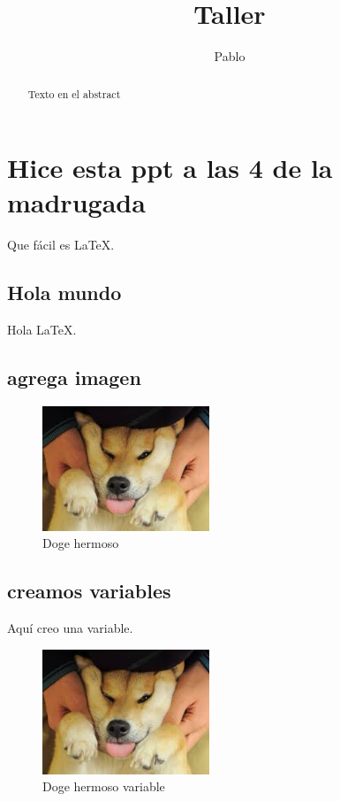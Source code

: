 \documentclass[]{article}
\title{Taller}
\author{Pablo}
\begin{document}
\maketitle

\begin{abstract}
	
	Texto en el abstract

\end{abstract}

\section{Hice esta ppt a las 4 de la madrugada}

Que fácil es \LaTeX.

\subsection{Hola mundo}

Hola \LaTeX.

\subsection{agrega imagen}

\begin{figure}[H]
	\centering
	\includegraphics[width=5cm]{doge.jpg}
	\caption{Doge hermoso}
	\label{doge}
\end{figure}

\subsection{creamos variables}

Aquí creo una variable.
\def\dogesize {5cm}

\begin{figure}[H]
	\centering
	\includegraphics[width=\dogesize]{doge.jpg}
	\caption{Doge hermoso variable}
\end{figure}
\end{document}
